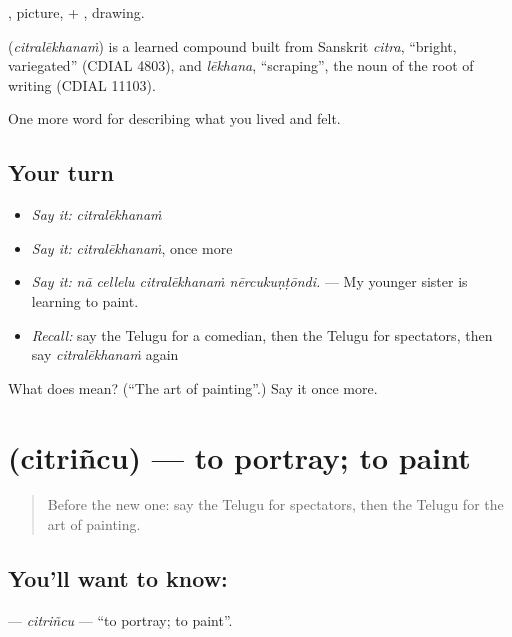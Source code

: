 , picture, + , drawing.

\begin{cousinweb}
\textbf{} (\emph{citralēkhanaṁ}) is a learned compound built from Sanskrit \emph{citra}, \textquotedblleft{}bright, variegated\textquotedblright{} (CDIAL 4803), and \emph{lēkhana}, \textquotedblleft{}scraping\textquotedblright{}, the noun of the root of writing (CDIAL 11103).
\end{cousinweb}

\begin{grammarlens}[title={What you've built}]
One more word for describing what you lived and felt.
\end{grammarlens}

\subsection*{Your turn}
\begin{itemize}
\raggedright
  \item \emph{Say it:} \emph{citralēkhanaṁ}
  \item \emph{Say it:} \emph{citralēkhanaṁ}, once more
  \item \emph{Say it:} \emph{nā cellelu citralēkhanaṁ nērcukuṇṭōndi.} — My younger sister is learning to paint.
  \item \emph{Recall:} say the Telugu for a comedian, then the Telugu for spectators, then say \emph{citralēkhanaṁ} again
\end{itemize}

\begin{tcolorbox}[breakable,colback=teal!4,colframe=teal!35!black,title={Before you move on}]
What does  mean? (\textquotedblleft{}The art of painting\textquotedblright{}.) Say it once more.
\end{tcolorbox}
\section[\texorpdfstring{\te{చిత్రించు} (citriñcu)}{చిత్రించు (citriñcu)}]{ (citriñcu) — to portray; to paint}

\label{lesson:TE-C542-citrincu}



\begin{quote}
Before the new one: say the Telugu for spectators, then the Telugu for the art of painting.
\end{quote}

\subsection*{You'll want to know: }
\textbf{} — \emph{citriñcu} — \textquotedblleft{}to portray; to paint\textquotedblright{}.

